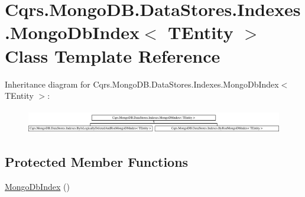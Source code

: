 \hypertarget{classCqrs_1_1MongoDB_1_1DataStores_1_1Indexes_1_1MongoDbIndex}{}\section{Cqrs.\+Mongo\+D\+B.\+Data\+Stores.\+Indexes.\+Mongo\+Db\+Index$<$ T\+Entity $>$ Class Template Reference}
\label{classCqrs_1_1MongoDB_1_1DataStores_1_1Indexes_1_1MongoDbIndex}
Inheritance diagram for Cqrs.\+Mongo\+D\+B.\+Data\+Stores.\+Indexes.\+Mongo\+Db\+Index$<$ T\+Entity $>$\+:\begin{figure}[H]
\begin{center}
\leavevmode
\includegraphics[height=1.052632cm]{classCqrs_1_1MongoDB_1_1DataStores_1_1Indexes_1_1MongoDbIndex}
\end{center}
\end{figure}
\subsection*{Protected Member Functions}
\begin{DoxyCompactItemize}
\item 
\hyperlink{classCqrs_1_1MongoDB_1_1DataStores_1_1Indexes_1_1MongoDbIndex_a61f4b17dd968f92e81562c70ae062a89}{Mongo\+Db\+Index} ()
\end{DoxyCompactItemize}
